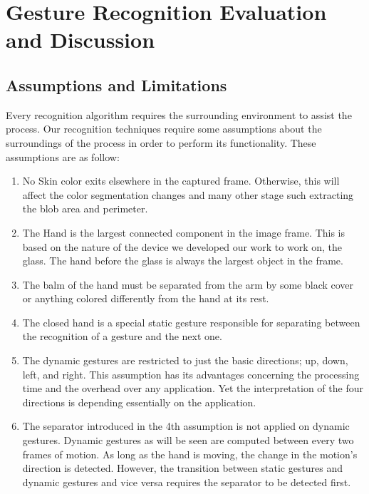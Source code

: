 \chapter{Gesture Recognition Evaluation and Discussion}
\label{ch_gr_eval}

\section{Assumptions and Limitations}
Every recognition algorithm requires the surrounding environment to assist the process. Our recognition techniques require some assumptions about the surroundings of the process in order to perform its functionality. These assumptions are as follow:\bigskip

\begin{enumerate}

\item No Skin color exits elsewhere in the captured frame. Otherwise, this will affect the color segmentation changes and many other stage such extracting the blob area and perimeter.

\item The Hand is the largest connected component in the image frame. This is based on the nature of the device we developed our work to work on, the glass. The hand before the glass is always the largest object in the frame.
\bigskip

\item The balm of the hand must be separated from the arm by some black cover or anything colored differently from the hand at its rest. 
\bigskip

\item The closed hand is a special static gesture responsible for separating between the recognition of a gesture and the next one. 
\bigskip

\item The dynamic gestures are restricted to just the basic directions; up, down, left, and right. This assumption has its advantages concerning the processing time and the overhead over any application. Yet the interpretation of the four directions is depending essentially on the application. 
\bigskip

\item The separator introduced in the 4th assumption is not applied on dynamic gestures. Dynamic gestures as will be seen are computed between every two frames of motion. As long as the hand is moving, the change in the motion's direction is detected. However, the transition between static gestures and dynamic gestures and vice versa requires the separator to be detected first. 
\end{enumerate}
\bigskip

